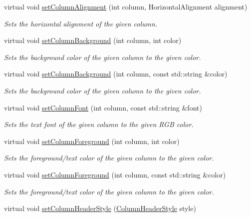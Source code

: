 \begin{DoxyCompactItemize}
virtual void \mbox{\hyperlink{classGTable_a84b3f42bb5d010483b78b9fd7e9c55f0}{set\+Column\+Alignment}} (int column, Horizontal\+Alignment alignment)
\begin{DoxyCompactList}\small\item\em Sets the horizontal alignment of the given column. \end{DoxyCompactList}\item 
virtual void \mbox{\hyperlink{classGTable_a48898e733d8ae3e285ff84d02e2cdee5}{set\+Column\+Background}} (int column, int color)
\begin{DoxyCompactList}\small\item\em Sets the background color of the given column to the given color. \end{DoxyCompactList}\item 
virtual void \mbox{\hyperlink{classGTable_a37fd3b921a5fba28b84dd4dd17fa9930}{set\+Column\+Background}} (int column, const std\+::string \&color)
\begin{DoxyCompactList}\small\item\em Sets the background color of the given column to the given color. \end{DoxyCompactList}\item 
virtual void \mbox{\hyperlink{classGTable_a0294ee7cb1af024bc77371f27d877164}{set\+Column\+Font}} (int column, const std\+::string \&font)
\begin{DoxyCompactList}\small\item\em Sets the text font of the given column to the given R\+GB color. \end{DoxyCompactList}\item 
virtual void \mbox{\hyperlink{classGTable_aa616c02b04beb6ca757dec04f46814b0}{set\+Column\+Foreground}} (int column, int color)
\begin{DoxyCompactList}\small\item\em Sets the foreground/text color of the given column to the given color. \end{DoxyCompactList}\item 
virtual void \mbox{\hyperlink{classGTable_a84ca08c2995646ab28c78bffbcdc2693}{set\+Column\+Foreground}} (int column, const std\+::string \&color)
\begin{DoxyCompactList}\small\item\em Sets the foreground/text color of the given column to the given color. \end{DoxyCompactList}\item 
virtual void \mbox{\hyperlink{classGTable_ac97cb91256925fa81c52594bca854969}{set\+Column\+Header\+Style}} (\mbox{\hyperlink{classGTable_a060cff504451bbb98530e64e936e2671}{Column\+Header\+Style}} style)

\end{DoxyCompactItemize}
